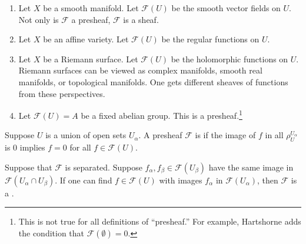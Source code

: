 \documentclass [11 pt, oneside] {article}
\begin{document}
\begin{example}[Presheaves]\label{}\text{}
\begin{enumerate}
	\item Let $X$ be a smooth manifold. Let $\mathscr{F}(U)$ be the smooth vector fields on $U$. Not only is $\mathscr{F}$ a presheaf, $\mathscr{F}$ is a sheaf.
	\item Let $X$ be an affine variety. Let $\mathscr{F}(U)$ be the regular functions on $U$.
	\item Let $X$ be a Riemann surface. Let $\mathscr{F}(U)$ be the holomorphic functions on $U$. Riemann surfaces can be viewed as complex manifolds, smooth real manifolds, or topological manifolds. One gets different sheaves of functions from these perspectives.
	\item Let $\mathscr{F}(U) = A$ be a fixed abelian group. This is a presheaf.\footnote{This is not true for all definitions of ``presheaf.'' For example, Hartshorne adds the condition that $\mathscr{F}(\emptyset) = 0$.}
\end{enumerate}
\end{example}


Suppose $U$ is a union of open sets $U_\alpha$. A presheaf $\mathscr{F}$ is  if the image of $f$ in all $\rho_{U}^{U_\alpha}$ is $0$ implies $f=0$ for all $f\in \mathscr{F}(U)$. 

Suppose that $\mathscr{F}$ is separated. Suppose $f_\alpha,f_\beta\in \mathscr{F}(U_\beta)$ have the same image in $\mathscr{F}(U_\alpha\cap U_\beta)$. If one can find $f\in \mathscr{F}(U)$ with images $f_\alpha$ in $\mathscr{F}(U_\alpha)$, then $\mathscr{F}$ is a .
\end{document}
